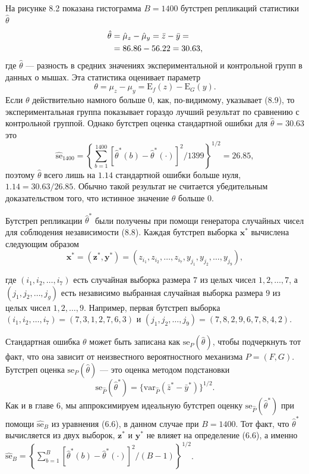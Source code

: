 На рисунке 8.2 показана гистограмма $B = 1400$ бутстреп репликаций статистики $\hat \theta$
 \begin{align}
 	\hat{\theta} & = \hat{\mu}_z - \hat{\mu}_y = \bar{z} - \bar{y} = \notag \\
 	& = 86.86 - 56.22 = 30.63,
 \end{align}
где $\hat \theta$ --- разность в средних значениях экспериментальной и контрольной групп в данных о мышах. Эта статистика оценивает параметр
\begin{equation}
	\theta = \mu_z - \mu_y = \text{E}_f(z) - \text{E}_G(y).
\end{equation}
Если $\theta$ действительно намного больше $0$, как, по-видимому, указывает (8.9), то экспериментальная группа показывает гораздо лучший результат по сравнению с контрольной группой. Однако бутстреп оценка стандартной ошибки для $\hat{\theta} = 30.63$ это
\begin{equation}
	\widehat{\text{se}}_{1400} = \left\{ \sum_{b=1}^{1400} [ \hat{\theta}^*(b) - \hat{\theta}^*(\cdot) ]^2 / 1399 \right\}^{1/2} = 26.85,
\end{equation}
поэтому $\hat{\theta}$ всего лишь на $1.14$ стандартной ошибки больше нуля, $1.14 = 30.63 / 26.85$. Обычно такой результат не считается убедительным доказательством того, что истинное значение $\theta$ больше $0$.

Бутстреп репликации $\hat{\theta}^*$ были получены при помощи генератора случайных чисел для соблюдения независимости (8.8). Каждая бутстреп выборка $\textbf{x}^*$ вычислена следующим образом
\begin{equation}
	\textbf{x}^* = (\textbf{z}^*, \textbf{y}^*) = (z_{i_1}, z_{i_2}, \ldots, z_{i_7}, y_{j_1}, y_{j_2}, \ldots, y_{j_9}),
\end{equation}

\noindent где $(i_1, i_2, \ldots, i_7)$ есть случайная выборка размера $7$ из целых чисел $1,2,\ldots,7$, а $(j_1, j_2, \ldots, j_g)$ есть независимо выбранная случайная выборка размера $9$ из целых чисел $1, 2, \ldots, 9$. Например, первая бутстреп выборка $(i_1, i_2, \ldots, i_7) = (7,3,1,2,7,6,3)$ и $(j_1, j_2, \ldots, j_9) = (7,8,2,9,6,7,8,4,2)$.

Стандартная ошибка $\theta$ может быть записана как $\text{se}_P(\hat{\theta})$, чтобы подчеркнуть тот факт, что она зависит от неизвестного вероятностного механизма $P = (F, G)$. Бутстреп оценка $\text{se}_P(\hat{\theta})$ --- это оценка методом подстановки
\begin{equation}
	\text{se}_{\hat{P}}(\hat{\theta}^*) = \{ \text{var}_{\hat{P}}(\bar{z}^* - \bar{y}^*) \}^{1/2}.
\end{equation}
Как и в главе 6, мы аппроксимируем идеальную бутстреп оценку $\text{se}_{\hat{P}}(\hat{\theta}^*)$ при помощи $\widehat{\text{se}}_B$ из уравнения (6.6), в данном случае при $B = 1400$. Тот факт, что $\hat{\theta}^*$ вычисляется из двух выборок, $\textbf{z}^*$ и $\textbf{y}^*$ не влияет на определение (6.6), а именно $\widehat{\text{se}}_B = \left\{ \sum_{b=1}^{B} [\hat{\theta}^*(b) - \hat{\theta}^*(\cdot)]^2/(B-1) \right\}^{1/2}$.

